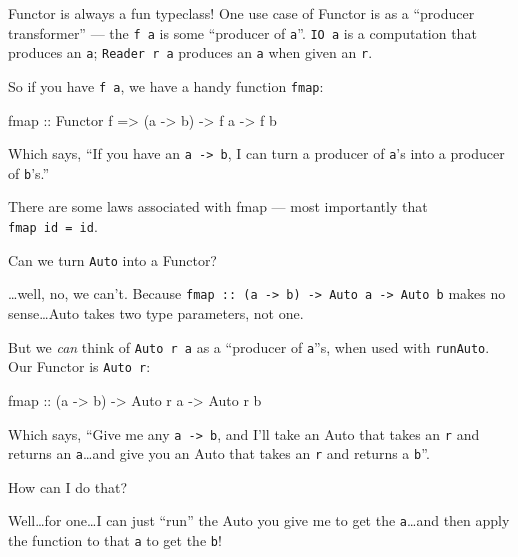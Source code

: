 \documentclass[]{article}
\newenvironment{Shaded}{}{}
\newcommand{\DataTypeTok}[1]{\textcolor[rgb]{0.56,0.13,0.00}{#1}}
\newcommand{\FunctionTok}[1]{\textcolor[rgb]{0.02,0.16,0.49}{#1}}
\newcommand{\NormalTok}[1]{#1}
\newcommand{\OtherTok}[1]{\textcolor[rgb]{0.00,0.44,0.13}{#1}}
\begin{document}
Functor is always a fun typeclass! One use case of Functor is as a ``producer
transformer'' --- the \texttt{f\ a} is some ``producer of \texttt{a}''.
\texttt{IO\ a} is a computation that produces an \texttt{a};
\texttt{Reader\ r\ a} produces an \texttt{a} when given an \texttt{r}.

So if you have \texttt{f\ a}, we have a handy function \texttt{fmap}:

\begin{Shaded}
\begin{Highlighting}[]
\FunctionTok{fmap}\OtherTok{ ::} \DataTypeTok{Functor}\NormalTok{ f }\OtherTok{=>}\NormalTok{ (a }\OtherTok{{-}>}\NormalTok{ b) }\OtherTok{{-}>}\NormalTok{ f a }\OtherTok{{-}>}\NormalTok{ f b}
\end{Highlighting}
\end{Shaded}

Which says, ``If you have an \texttt{a\ -\textgreater{}\ b}, I can turn a
producer of \texttt{a}'s into a producer of \texttt{b}'s.''

There are some laws associated with fmap --- most importantly that
\texttt{fmap\ id\ =\ id}.

Can we turn \texttt{Auto} into a Functor?

\ldots well, no, we can't. Because
\texttt{fmap\ ::\ (a\ -\textgreater{}\ b)\ -\textgreater{}\ Auto\ a\ -\textgreater{}\ Auto\ b}
makes no sense\ldots Auto takes two type parameters, not one.

But we \emph{can} think of \texttt{Auto\ r\ a} as a ``producer of \texttt{a}''s,
when used with \texttt{runAuto}. Our Functor is \texttt{Auto\ r}:

\begin{Shaded}
\begin{Highlighting}[]
\FunctionTok{fmap}\OtherTok{ ::}\NormalTok{ (a }\OtherTok{{-}>}\NormalTok{ b) }\OtherTok{{-}>} \DataTypeTok{Auto}\NormalTok{ r a }\OtherTok{{-}>} \DataTypeTok{Auto}\NormalTok{ r b}
\end{Highlighting}
\end{Shaded}

Which says, ``Give me any \texttt{a\ -\textgreater{}\ b}, and I'll take an Auto
that takes an \texttt{r} and returns an \texttt{a}\ldots and give you an Auto
that takes an \texttt{r} and returns a \texttt{b}''.

How can I do that?

Well\ldots for one\ldots I can just ``run'' the Auto you give me to get the
\texttt{a}\ldots and then apply the function to that \texttt{a} to get the
\texttt{b}!
\end{document}
